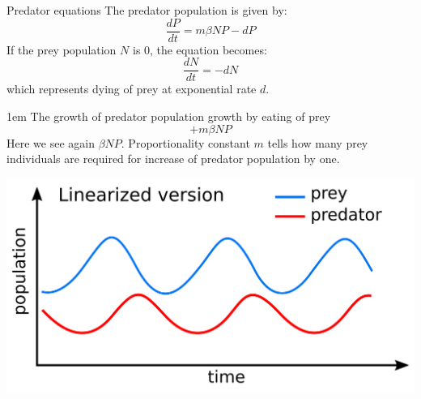 \begin{frame}{Predator equations}
\footnotesize
    The predator population is given by:
      \begin{equation}
        \frac{dP}{dt} = m\beta NP - dP
    \end{equation}
    \pause
    If the prey population $N$ is 0, the equation becomes:
    \begin{equation}
        \frac{dN}{dt} = - dN 
    \end{equation}
    which represents dying of prey at exponential rate $d$.

\vfill{1em}
     \pause
    The growth of predator population growth by eating of prey
    \begin{equation}
        + m \beta NP
    \end{equation}
    Here we see again $\beta NP$. Proportionality constant $m$ tells how many prey individuals are required for increase of predator population by one. 
\end{frame}


\begin{frame}
\begin{center}
    \includegraphics[scale = 0.1]{lesson_2/images/predator_prey_in_time.png}
\end{center}
    
\end{frame}

